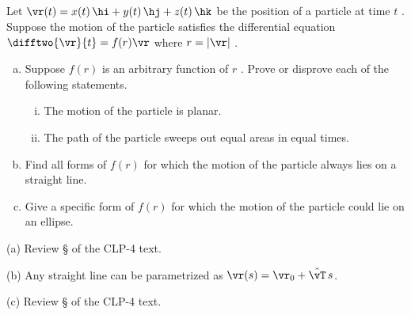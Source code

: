 



\subsection*{\Procedural}

\subsection*{\Application}


\begin{question}[M317 2010A] %
Let $\vr(t) = x(t)\,\hi + y (t)\,\hj + z(t)\,\hk$ be the position 
of a particle at time $t$ . Suppose the motion of the particle satisfies 
the differential equation
$\difftwo{\vr}{t} = f (r) \vr$ 
where $r = |\vr|$ .
\begin{enumerate}[(a)]
\item
Suppose $f(r)$ is an arbitrary function of $r$ . Prove or disprove each 
of the following statements.
\begin{enumerate}[(i)]
\item
The motion of the particle is planar.
\item
The path of the particle sweeps out equal areas in equal times.
\end{enumerate}
\item
Find all forms of $f(r)$ for which the motion of the particle always lies 
on a straight line.
\item
Give a specific form of $f(r)$ for which the motion of the particle could 
lie on an ellipse.
\end{enumerate}
\end{question}

\begin{hint} 
(a) Review \S{} of the CLP-4 text.

(b) Any straight line can be parametrized as $\vr(s) = \vr_0+\hat\vT\, s$.

(c) Review \S{} of the CLP-4 text.
\end{hint}

